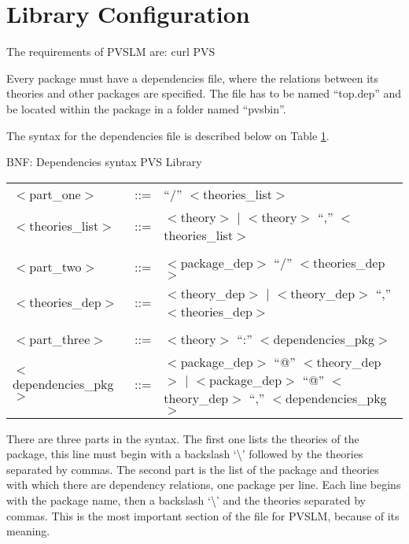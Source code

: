 \section{Library Configuration}
\label{ssec:config}

The requirements of PVSLM are:
curl
PVS

Every package must have a dependencies file, where the relations between its theories and other packages are specified. The file has to be named ``top.dep'' and be located within the package in a folder named ``pvsbin''. 

The syntax for the dependencies file is described below on Table \ref{tab:bnf}.

\begin{table}[h!]
  \begin{center}
    BNF: Dependencies syntax PVS Library \\
    \begin{tabular}{ l l p{8cm} }

       \hline
      $<$part\_one$>$ & ::= & ``/'' $<$theories\_list$>$\\
      $<$theories\_list$>$ & ::= &  $<$theory$>$ $|$ $<$theory$>$ ``,'' $<$theories\_list$>$\\
      \\
      $<$part\_two$>$ & ::= &  $<$package\_dep$>$ ``/'' $<$theories\_dep$>$\\
      $<$theories\_dep$>$ & ::= &  $<$theory\_dep$>$ $|$ $<$theory\_dep$>$ ``,'' $<$theories\_dep$>$\\
      \\
      $<$part\_three$>$ & ::= &  $<$theory$>$ ``:'' $<$dependencies\_pkg$>$\\
      $<$dependencies\_pkg$>$ & ::= &  $<$package\_dep$>$ ``@'' $<$theory\_dep$>$ $|$ $<$package\_dep$>$ ``@'' $<$theory\_dep$>$ ``,'' $<$dependencies\_pkg$>$\\
      \hline
    \end{tabular}
  \end{center}
  \label{tab:bnf}
\end{table}

There are three parts in the syntax. The first one lists the theories of the package, this line must begin with a backslash `\textbackslash' followed by the theories separated by commas. The second part is the list of the package and theories with which there are dependency relations, one package per line. Each line begins with the package name, then a backslash `\textbackslash' and the theories separated by commas. This is the most important section of the file for PVSLM, because of its meaning. 

